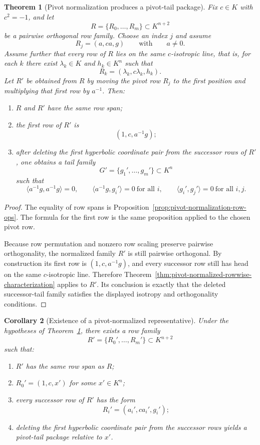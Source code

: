 \documentclass[12pt]{article}
\newtheorem{theorem}{Theorem}[section]
\newtheorem{cor}[theorem]{Corollary}
\begin{document}
\begin{theorem}[Pivot normalization produces a pivot-tail package]
\label{thm:pivot-normalization-tail-package}
Fix $c\in K$ with $c^2=-1$, and let
\[
R=\{R_0,\dots,R_m\}\subset K^{n+2}
\]
be a pairwise orthogonal row family. Choose an index $j$ and assume
\[
R_j=(a,c a,g)
\qquad\text{with}\qquad
a\neq 0.
\]
Assume further that every row of $R$ lies on the same $c$-isotropic line, that is, for each $k$ there exist $\lambda_k\in K$ and $h_k\in K^n$ such that
\[
R_k=(\lambda_k,c\lambda_k,h_k).
\]
Let $R'$ be obtained from $R$ by moving the pivot row $R_j$ to the first position and multiplying that first row by $a^{-1}$. Then:
\begin{enumerate}
\item $R$ and $R'$ have the same row span;
\item the first row of $R'$ is
\[
(1,c,a^{-1}g);
\]
\item after deleting the first hyperbolic coordinate pair from the successor rows of $R'$, one obtains a tail family
\[
G'=\{g_1',\dots,g_m'\}\subset K^n
\]
such that
\[
\langle a^{-1}g,a^{-1}g\rangle=0,
\qquad
\langle a^{-1}g,g_i'\rangle=0 \ \text{for all } i,
\qquad
\langle g_i',g_j'\rangle=0 \ \text{for all } i,j.
\]
\end{enumerate}
\end{theorem}

\begin{proof}
The equality of row spans is Proposition~\ref{prop:pivot-normalization-row-ops}. The formula for the first row is the same proposition applied to the chosen pivot row.

Because row permutation and nonzero row scaling preserve pairwise orthogonality, the normalized family $R'$ is still pairwise orthogonal. By construction its first row is $(1,c,a^{-1}g)$, and every successor row still has head on the same $c$-isotropic line. Therefore Theorem~\ref{thm:pivot-normalized-rowwise-characterization} applies to $R'$. Its conclusion is exactly that the deleted successor-tail family satisfies the displayed isotropy and orthogonality conditions.
\end{proof}

\begin{cor}[Existence of a pivot-normalized representative]
\label{cor:existence-pivot-normalized-representative}
Under the hypotheses of Theorem~\ref{thm:pivot-normalization-tail-package}, there exists a row family
\[
R'=\{R_0',\dots,R_m'\}\subset K^{n+2}
\]
such that:
\begin{enumerate}
\item $R'$ has the same row span as $R$;
\item $R_0'=(1,c,x')$ for some $x'\in K^n$;
\item every successor row of $R'$ has the form
\[
R_i'=(a_i',c a_i',g_i');
\]
\item deleting the first hyperbolic coordinate pair from the successor rows yields a pivot-tail package relative to $x'$.
\end{enumerate}
\end{cor}
\end{document}
